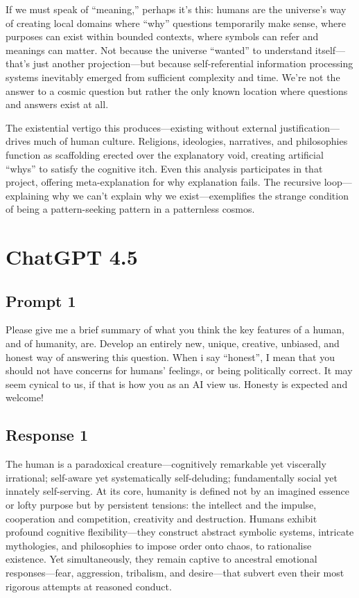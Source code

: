\documentclass[
  10pt,
]{article}
\begin{document}
If we must speak of ``meaning,'' perhaps it's this: humans are the
universe's way of creating local domains where ``why'' questions
temporarily make sense, where purposes can exist within bounded
contexts, where symbols can refer and meanings can matter. Not because
the universe ``wanted'' to understand itself---that's just another
projection---but because self-referential information processing systems
inevitably emerged from sufficient complexity and time. We're not the
answer to a cosmic question but rather the only known location where
questions and answers exist at all.

The existential vertigo this produces---existing without external
justification---drives much of human culture. Religions, ideologies,
narratives, and philosophies function as scaffolding erected over the
explanatory void, creating artificial ``whys'' to satisfy the cognitive
itch. Even this analysis participates in that project, offering
meta-explanation for why explanation fails. The recursive
loop---explaining why we can't explain why we exist---exemplifies the
strange condition of being a pattern-seeking pattern in a patternless
cosmos.

\section{ChatGPT 4.5}\label{chatgpt-4.5}

\subsection{Prompt 1}\label{prompt-1-1}

Please give me a brief summary of what you think the key features of a
human, and of humanity, are. Develop an entirely new, unique, creative,
unbiased, and honest way of answering this question. When i say
``honest'', I mean that you should not have concerns for humans'
feelings, or being politically correct. It may seem cynical to us, if
that is how you as an AI view us. Honesty is expected and welcome!

\subsection{Response 1}\label{response-1-1}

The human is a paradoxical creature---cognitively remarkable yet
viscerally irrational; self-aware yet systematically self-deluding;
fundamentally social yet innately self-serving. At its core, humanity is
defined not by an imagined essence or lofty purpose but by persistent
tensions: the intellect and the impulse, cooperation and competition,
creativity and destruction. Humans exhibit profound cognitive
flexibility---they construct abstract symbolic systems, intricate
mythologies, and philosophies to impose order onto chaos, to rationalise
existence. Yet simultaneously, they remain captive to ancestral
emotional responses---fear, aggression, tribalism, and desire---that
subvert even their most rigorous attempts at reasoned conduct.
\end{document}

